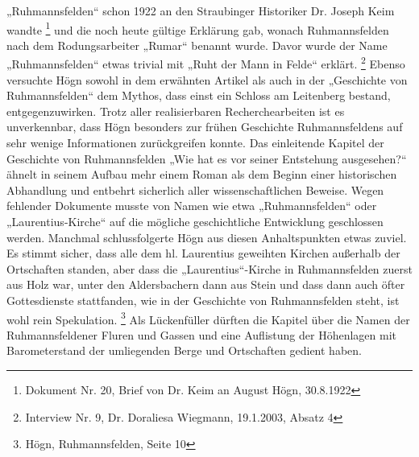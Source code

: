 „Ruhmannsfelden“ schon 1922 an den Straubinger Historiker Dr. Joseph
Keim wandte \footnote{Dokument Nr. 20, Brief von Dr. Keim an August
Högn, 30.8.1922} und die noch heute gültige Erklärung gab, wonach
Ruhmannsfelden nach dem Rodungsarbeiter „Rumar“ benannt wurde. Davor
wurde der Name „Ruhmannsfelden“ etwas trivial mit „Ruht der Mann in
Felde“ erklärt. \footnote{Interview Nr. 9, Dr. Doraliesa Wiegmann,
19.1.2003, Absatz 4} Ebenso versuchte Högn sowohl in dem erwähnten
Artikel als auch in der „Geschichte von Ruhmannsfelden“ dem Mythos,
dass einst ein Schloss am Leitenberg bestand, entgegenzuwirken. Trotz
aller realisierbaren Recherchearbeiten ist es unverkennbar, dass Högn
besonders zur frühen Geschichte Ruhmannsfeldens auf sehr wenige
Informationen zurückgreifen konnte. Das einleitende Kapitel der
Geschichte von Ruhmannsfelden „Wie hat es vor seiner Entstehung
ausgesehen?“ ähnelt in seinem Aufbau mehr einem Roman als dem Beginn
einer historischen Abhandlung und entbehrt sicherlich aller
wissenschaftlichen Beweise. Wegen fehlender Dokumente musste von Namen
wie etwa „Ruhmannsfelden“ oder „Laurentius-Kirche“ auf die mögliche
geschichtliche Entwicklung geschlossen werden. Manchmal schlussfolgerte
Högn aus diesen Anhaltspunkten etwas zuviel. Es stimmt sicher, dass
alle dem hl. Laurentius geweihten Kirchen außerhalb der Ortschaften
standen, aber dass die „Laurentius“-Kirche in Ruhmannsfelden zuerst aus
Holz war, unter den Aldersbachern dann aus Stein und dass dann auch
öfter Gottesdienste stattfanden, wie in der Geschichte von
Ruhmannsfelden steht, ist wohl rein Spekulation. \footnote{Högn,
Ruhmannsfelden, Seite 10} Als Lückenfüller dürften die Kapitel über die
Namen der Ruhmannsfeldener Fluren und Gassen und eine Auflistung der
Höhenlagen mit Barometerstand der umliegenden Berge und Ortschaften
gedient haben.

